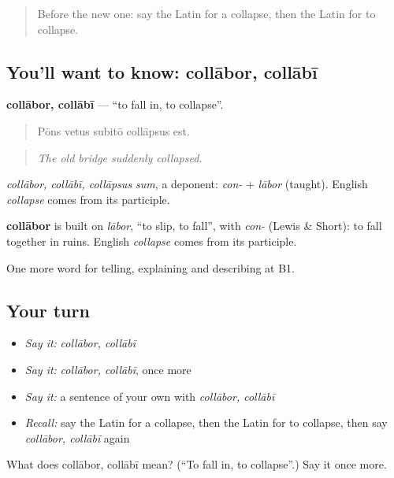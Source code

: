 \begin{quote}
Before the new one: say the Latin for a collapse, then the Latin for to collapse.
\end{quote}

\subsection*{You'll want to know: collābor, collābī}
\textbf{collābor, collābī} — \textquotedblleft{}to fall in, to collapse\textquotedblright{}.

\begin{quote}
Pōns vetus subitō collāpsus est.
\end{quote}

\begin{quote}
\emph{The old bridge suddenly collapsed.}
\end{quote}

\emph{collābor, collābī, collāpsus sum}, a deponent: \emph{con-} + \emph{lābor} (taught). English \emph{collapse} comes from its participle.

\begin{cousinweb}
\textbf{collābor} is built on \emph{lābor}, \textquotedblleft{}to slip, to fall\textquotedblright{}, with \emph{con-} (Lewis \& Short): to fall together in ruins. English \emph{collapse} comes from its participle.
\end{cousinweb}

\begin{grammarlens}[title={What you've built}]
One more word for telling, explaining and describing at B1.
\end{grammarlens}

\subsection*{Your turn}
\begin{itemize}
\raggedright
  \item \emph{Say it:} \emph{collābor, collābī}
  \item \emph{Say it:} \emph{collābor, collābī}, once more
  \item \emph{Say it:} a sentence of your own with \emph{collābor, collābī}
  \item \emph{Recall:} say the Latin for a collapse, then the Latin for to collapse, then say \emph{collābor, collābī} again
\end{itemize}

\begin{tcolorbox}[breakable,colback=teal!4,colframe=teal!35!black,title={Before you move on}]
What does collābor, collābī mean? (\textquotedblleft{}To fall in, to collapse\textquotedblright{}.) Say it once more.
\end{tcolorbox}
